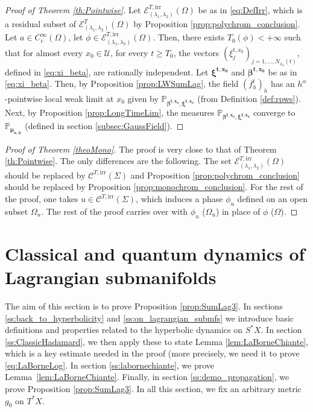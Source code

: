 \documentclass[10pt]{amsart}
\let\mathcal\mathscr
\newcommand{\rc}{\mathrm{c}}
\newcommand{\irr}{\mathrm{irr}}
\theoremstyle{plain}
\theoremstyle{definition}
\def\calC{\mathcal{C}}
\def\calE{\mathcal{E}}
\def\calU{\mathcal{U}}
\begin{document}
\begin{proof}[Proof of Theorem \ref{th:Pointwise}]
Let $\calE^{T,\irr}_{(\lambda_1,\lambda_2)}(\Omega)$ be as in \eqref{eq:DefIrr}, which is a residual subset of $\calE^T_{(\lambda_1,\lambda_2)}(\Omega)$ by Proposition \ref{prop:polychrom_conclusion}. Let $a\in C_\rc^\infty(\Omega)$, let $\phi\in\calE^{T,\irr}_{(\lambda_1,\lambda_2)}(\Omega)$. Then, there exists $T_0(\phi)<+\infty$ such that for almost every $x_0\in\calU$, for every $t\geq T_0$, the vectors $(\xi_j^{t,x_0})_{j=1,\dots,N_{x_0}(t)}$, defined in \eqref{eq:xi_beta}, are rationally independent. Let $\boldsymbol{\xi^{t,x_0}}$ and $\boldsymbol{\beta^{t,x_0}}$ be as in \eqref{eq:xi_beta}. Then, by Proposition \ref{prop:LWSumLag}, the field $(f_h^t)_h$ has an $h^\alpha$-pointwise local weak limit at $x_0$ given by $\mathbb{P}_{\boldsymbol{\beta^{t,x_0}},\boldsymbol{\xi^{t,x_0}}}$ (from Definition \ref{def:rpws}). Next, by Proposition \ref{prop:LongTimeLim}, the measures $\mathbb{P}_{\boldsymbol{\beta^{t,x_0}},\boldsymbol{\xi^{t,x_0}}}$ converge to $\mathbb{P}_{\boldsymbol{\mu_{a,\phi}}}$ (defined in section \ref{subsec:GaussField}).
\end{proof}
\begin{proof}[Proof of Theorem \ref{theoMono}]
The proof is very close to that of Theorem \ref{th:Pointwise}. The only differences are the following. The set $\calE^{T,\irr}_{(\lambda_1,\lambda_2)}(\Omega)$ should be replaced by $\calC^{T,\irr}(\Sigma)$ and Proposition \ref{prop:polychrom_conclusion} should be replaced by Proposition \ref{prop:monochrom_conclusion}. For the rest of the proof, one takes $u\in\calC^{T,\irr}(\Sigma)$, which induces a phase $\phi_u$ defined on an open subset $\Omega_u$. The rest of the proof carries over with $\phi_u$ (\resp $\Omega_u$) in place of $\phi$ (\resp $\Omega$).
\end{proof}

\section{Classical and quantum dynamics of Lagrangian submanifolds}\label{sec:ClasDyn}

The aim of this section is to prove Proposition \ref{prop:SumLag3}. In sections \ref{ss:back_to_hyperbolicity} and \ref{ss:on_lagrangian_submfs} we introduce basic definitions and properties related to the hyperbolic dynamics on $S^*X$. In section \ref{ss:ClassicHadamard}, we then apply these to state Lemma \ref{lem:LaBorneChiante}, which is a key estimate needed in the proof (more precisely, we need it to prove \eqref{eq:LaBorneLog}. In section \ref{ss:labornechiante}, we prove Lem\-ma~\ref{lem:LaBorneChiante}. Finally, in section \ref{ss:demo_propagation}, we prove Proposition \ref{prop:SumLag3}. In all this section, we fix an arbitrary metric $g_0$ on $T^*X$.
\end{document}

